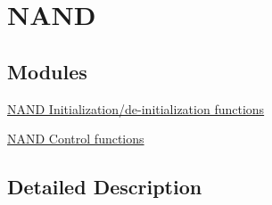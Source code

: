 \hypertarget{group___f_m_c___l_l___n_a_n_d}{}\section{N\+A\+ND}
\label{group___f_m_c___l_l___n_a_n_d}
\subsection*{Modules}
\begin{DoxyCompactItemize}
\item 
\hyperlink{group___f_m_c___l_l___n_a_n_d___private___functions___group1}{N\+A\+N\+D Initialization/de-\/initialization functions}
\item 
\hyperlink{group___f_m_c___l_l___n_a_n_d___private___functions___group2}{N\+A\+N\+D Control functions}
\end{DoxyCompactItemize}


\subsection{Detailed Description}
